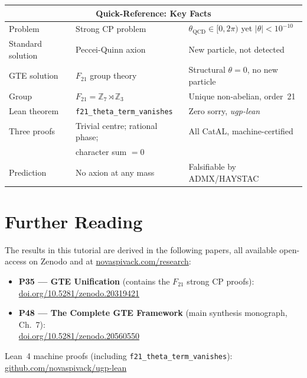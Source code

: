 \documentclass[11pt,a4paper]{article}
\newcommand{\lean}[1]{\texttt{#1}}
\begin{document}
\begin{center}
\begin{tabular}{@{}p{3.0cm}p{4.8cm}p{5.0cm}@{}}
\toprule
\multicolumn{3}{c}{\textbf{Quick-Reference: Key Facts}} \\
\midrule
Problem & Strong CP problem & $\theta_{\mathrm{QCD}} \in [0,2\pi)$ yet $|\theta| < 10^{-10}$ \\
Standard solution & Peccei-Quinn axion & New particle, not detected \\
GTE solution & $F_{21}$ group theory & Structural $\theta = 0$, no new particle \\
Group & $F_{21} = \mathbb{Z}_7\rtimes\mathbb{Z}_3$ & Unique non-abelian, order~21 \\
Lean theorem & \lean{f21\_theta\_term\_vanishes} & Zero sorry, \textit{ugp-lean} \\
Three proofs & Trivial centre; rational phase; & All CatAL, machine-certified \\
              & character sum $= 0$ & \\
Prediction & No axion at any mass & Falsifiable by ADMX/HAYSTAC \\
\bottomrule
\end{tabular}
\end{center}

\bigskip

\section*{Further Reading}
\begin{tcolorbox}[colback=orange!8,colframe=orange!50!black,
  title=\textbf{Primary Sources}]
The results in this tutorial are derived in the following papers,
all available open-access on Zenodo and at
\href{https://novaspivack.com/research}{novaspivack.com/research}:
\begin{itemize}
  \item \textbf{P35 --- GTE Unification} (contains the $F_{21}$ strong CP proofs):\\
        \href{https://doi.org/10.5281/zenodo.20319421}{doi.org/10.5281/zenodo.20319421}
  \item \textbf{P48 --- The Complete GTE Framework} (main synthesis monograph, Ch.~7):\\
        \href{https://doi.org/10.5281/zenodo.20560550}{doi.org/10.5281/zenodo.20560550}
\end{itemize}
Lean~4 machine proofs (including \texttt{f21\_theta\_term\_vanishes}):
\href{https://github.com/novaspivack/ugp-lean}{github.com/novaspivack/ugp-lean}
\end{tcolorbox}


\end{document}
